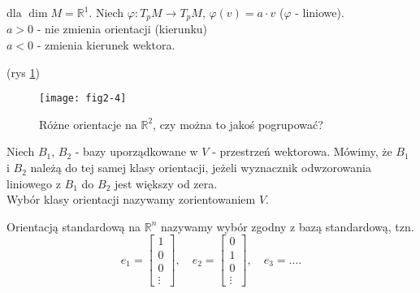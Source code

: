 \documentclass[../main.tex]{subfiles}
\begin{document}
dla $\dim M = \mathbb{R}^1$. Niech $\varphi : T_pM \to T_pM$, $\varphi(v) = a\cdot v$ ($\varphi$ - liniowe).\\
$a > 0$ - nie zmienia orientacji (kierunku)\\
$a < 0$ - zmienia kierunek wektora.

(rys \ref{fig:fig2-4})
\begin{figure}[h]
    \centering
    \texttt{[image: fig2-4]}
    \caption{Różne orientacje na $\mathbb{R}^2$, czy można to jakoś pogrupować?}
    \label{fig:fig2-4}
\end{figure}

\begin{definicja}
    Niech $B_1$, $B_2$ - bazy uporządkowane w $V$ - przestrzeń wektorowa. Mówimy, że $B_1$ i $B_2$ należą do tej samej klasy orientacji, jeżeli wyznacznik odwzorowania liniowego z $B_1$ do $B_2$ jest większy od zera.\\
    Wybór klasy orientacji nazywamy zorientowaniem $V$.
\end{definicja}
\begin{definicja}
    Orientacją standardową na $\mathbb{R}^n$ nazywamy wybór zgodny z bazą standardową, tzn.
    \[
        e_1 = \begin{bmatrix} 1\\0\\0\\ \vdots \end{bmatrix},\quad e_2 = \begin{bmatrix} 0\\1\\0\\ \vdots \end{bmatrix},\quad e_3 = \ldots
    .\]
\end{definicja}
\end{document}
